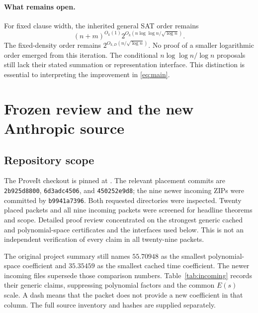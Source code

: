 \documentclass[11pt]{article}
\theoremstyle{definition}\newtheorem{definition}[theorem]{Definition}
\theoremstyle{remark}\newtheorem{remark}[theorem]{Remark}
\begin{document}
\paragraph{What remains open.}
For fixed clause width, the inherited general SAT order remains
\begin{equation}\label{eq:satorder}
 (n+m)^{O_k(1)}2^{O_k(n\log\log n/\sqrt{\log n})}.
\end{equation}
The fixed-density order remains $2^{O_{k,D}(n/\sqrt{\log n})}$.
No proof of a smaller logarithmic order emerged from this iteration.
The conditional $n\log\log n/\log n$ proposals still lack their stated
summation or representation interface. This distinction is essential to
interpreting the improvement in \eqref{eq:main}.

\section{Frozen review and the new Anthropic source}
\label{sec:review}

\subsection{Repository scope}
The ProveIt checkout is pinned at
.
The relevant placement commits are \texttt{2b925d8800},
\texttt{6d3adc4506}, and \texttt{450252e9d8}; the nine newer incoming ZIPs
were committed by \texttt{b9941a7396}. Both requested directories were
inspected. Twenty placed packets and all nine incoming packets were screened
for headline theorems and scope. Detailed proof review concentrated on the
strongest generic cached and polynomial-space certificates and the
interfaces used below. This is not an independent verification of every
claim in all twenty-nine packets.

The original project summary still names $55.70948$ as the smallest
polynomial-space coefficient and $35.35459$ as the smallest cached time
coefficient. The newer incoming files supersede those comparison numbers.
Table~\ref{tab:incoming} records their generic claims, suppressing polynomial
factors and the common $E(s)$ scale. A dash means that the packet does not
provide a new coefficient in that column. The full source inventory and
hashes are supplied separately.
\end{document}
